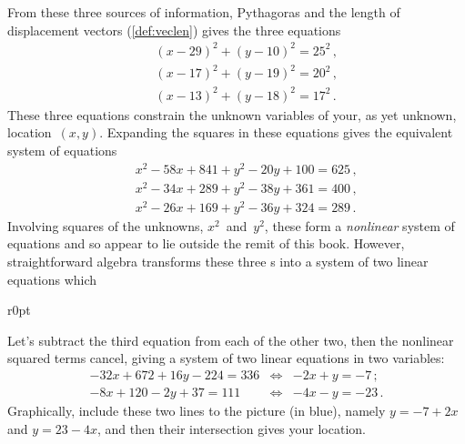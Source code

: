 \begin{example}
\begin{solution} 
From these three sources of information, Pythagoras and the length of displacement vectors (\cref{def:veclen}) gives the three equations
\begin{eqnarray*}
&&(x-29)^2+(y-10)^2=25^2\,,
\\&&(x-17)^2+(y-19)^2=20^2\,,
\\&&(x-13)^2+(y-18)^2=17^2\,.
\end{eqnarray*}
These three equations constrain the unknown variables of your, as yet unknown, location~\((x,y)\).
Expanding the squares in these equations gives the equivalent system of equations
\begin{eqnarray*}
&&x^2-58x+841+y^2-20y+100=625\,,
\\&&x^2-34x+289+y^2-38y+361=400\,,
\\&&x^2-26x+169+y^2-36y+324=289\,.
\end{eqnarray*}
Involving squares of the unknowns, \(x^2\)~and~\(y^2\), these form a \emph{nonlinear} system of equations and so appear to lie outside the remit of this book.  
However, straightforward algebra transforms these three s into a system of two linear equations which 

\begin{wrapfigure}r{0pt}
\end{wrapfigure}
Let's subtract the third equation from each of the other two, then the nonlinear squared terms cancel, giving a system of two linear equations in two variables:
\begin{eqnarray*}
-32x+672+16y-224=336&\iff&-2x+y=-7\,;
\\-8x+120-2y+37=111&\iff&-4x-y=-23\,.
\end{eqnarray*}%
Graphically, include these two lines to the picture (in blue), namely \(y=-7+2x\) and \(y=23-4x\), and then their intersection gives your location.


\end{solution}
\end{example}
